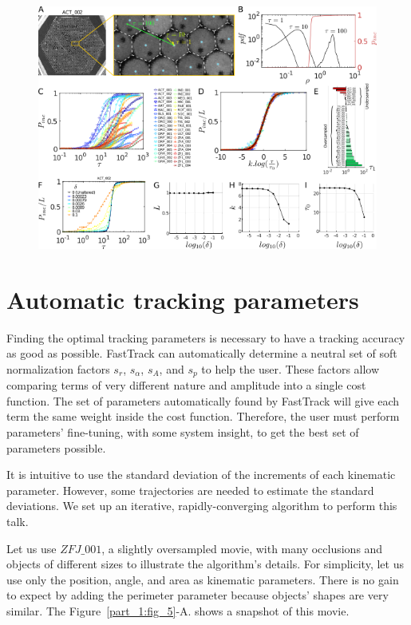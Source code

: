     \begin{figure}[h!]
    \centering
    \includegraphics[width=1\textwidth]{part_1/assets/Figure_3.png}
    \caption{\textbf{}}
    \label{part_1:fig_3}
    \end{figure}

    \section{Automatic tracking parameters}
    Finding the optimal tracking parameters is necessary to have a tracking accuracy as good as possible. FastTrack can automatically determine a neutral set of soft normalization factors $s_r$, $s_\alpha$, $s_A$, and $s_p$ to help the user. These factors allow comparing terms of very different nature and amplitude into a single cost function. The set of parameters automatically found by FastTrack will give each term the same weight inside the cost function. Therefore, the user must perform parameters' fine-tuning, with some system insight, to get the best set of parameters possible.

    It is intuitive to use the standard deviation of the increments of each kinematic parameter. However, some trajectories are needed to estimate the standard deviations. We set up an iterative, rapidly-converging algorithm to perform this talk.

    Let us use $ZFJ\_001$, a slightly oversampled movie, with many occlusions and objects of different sizes to illustrate the algorithm's details. For simplicity, let us use only the position, angle, and area as kinematic parameters. There is no gain to expect by adding the perimeter parameter because objects' shapes are very similar. The Figure~\ref{part_1:fig_5}-A. shows a snapshot of this movie.

